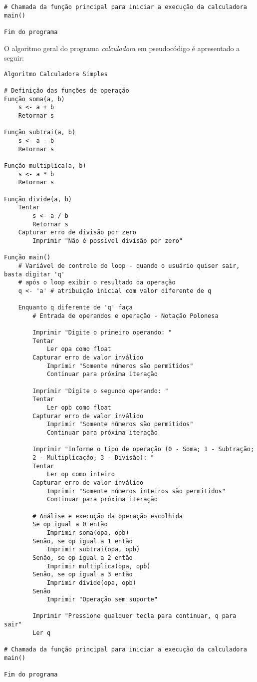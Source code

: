 \documentclass[a4paper, 12pt, onecolumn,singlespacing]{article}
\begin{document}
\begin{verbatim}
# Chamada da função principal para iniciar a execução da calculadora
main()

Fim do programa
\end{verbatim}

O algoritmo geral do programa \textit{calculadora} em pseudocódigo é apresentado a seguir:

\begin{verbatim}
Algoritmo Calculadora Simples

# Definição das funções de operação
Função soma(a, b)
	s <- a + b
	Retornar s

Função subtrai(a, b)
	s <- a - b
	Retornar s

Função multiplica(a, b)
	s <- a * b
	Retornar s

Função divide(a, b)
	Tentar
		s <- a / b
		Retornar s
	Capturar erro de divisão por zero
		Imprimir "Não é possível divisão por zero"

Função main()
	# Variável de controle do loop - quando o usuário quiser sair, basta digitar 'q'
	# após o loop exibir o resultado da operação
	q <- 'a' # atribuição inicial com valor diferente de q
	
	Enquanto q diferente de 'q' faça
		# Entrada de operandos e operação - Notação Polonesa
		
		Imprimir "Digite o primeiro operando: "
		Tentar
			Ler opa como float
		Capturar erro de valor inválido
			Imprimir "Somente números são permitidos"
			Continuar para próxima iteração
		
		Imprimir "Digite o segundo operando: "
		Tentar
			Ler opb como float
		Capturar erro de valor inválido
			Imprimir "Somente números são permitidos"
			Continuar para próxima iteração
		
		Imprimir "Informe o tipo de operação (0 - Soma; 1 - Subtração; 
		2 - Multiplicação; 3 - Divisão): "
		Tentar
			Ler op como inteiro
		Capturar erro de valor inválido
			Imprimir "Somente números inteiros são permitidos"
			Continuar para próxima iteração
		
		# Análise e execução da operação escolhida
		Se op igual a 0 então
			Imprimir soma(opa, opb)
		Senão, se op igual a 1 então
			Imprimir subtrai(opa, opb)
		Senão, se op igual a 2 então
			Imprimir multiplica(opa, opb)
		Senão, se op igual a 3 então
			Imprimir divide(opa, opb)
		Senão
			Imprimir "Operação sem suporte"
		
		Imprimir "Pressione qualquer tecla para continuar, q para sair"
		Ler q

# Chamada da função principal para iniciar a execução da calculadora
main()

Fim do programa
	
\end{verbatim}
\end{document}
